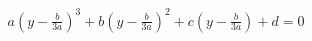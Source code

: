 \documentclass[preview]{standalone}
\begin{document}
\begin{align*}
a\left(y-\frac{b}{3a}\right)^3 + b\left(y-\frac{b}{3a}\right)^2 + c\left(y-\frac{b}{3a}\right) + d = 0
\end{align*}
\end{document}
